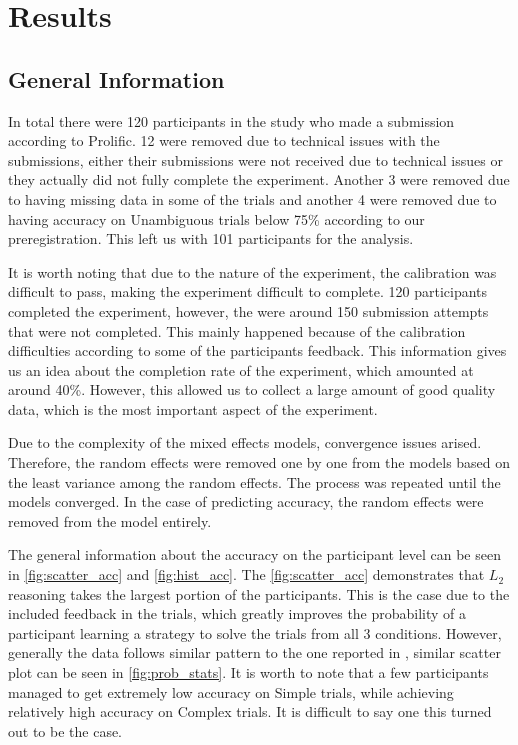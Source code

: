 ﻿\chapter{Results}
\label{chap:results}

\section{General Information}
\label{sec:general_info}
In total there were 120 participants in the study who made a submission according to Prolific. 12 were removed due to technical issues with the submissions, either their submissions were not received due to technical issues or they actually did not fully complete the experiment. Another 3 were removed due to having missing data in some of the trials and another 4 were removed due to having accuracy on Unambiguous trials below 75\% according to our preregistration. This left us with 101 participants for the analysis. 

It is worth noting that due to the nature of the experiment, the calibration was difficult to pass, making the experiment difficult to complete. 120 participants completed the experiment, however, the were around 150 submission attempts that were not completed. This mainly happened because of the calibration difficulties according to some of the participants feedback. This information gives us an idea about the completion rate of the experiment, which amounted at around 40\%. However, this allowed us to collect a large amount of good quality data, which is the most important aspect of the experiment.

Due to the complexity of the mixed effects models, convergence issues arised. Therefore, the random effects were removed one by one from the models based on the least variance among the random effects. The process was repeated until the models converged. In the case of predicting accuracy, the random effects were removed from the model entirely. 

The general information about the accuracy on the participant level can be seen in \autoref{fig:scatter_acc} and \autoref{fig:hist_acc}. The \autoref{fig:scatter_acc} demonstrates that $L_2$ reasoning takes the largest portion of the participants. This is the case due to the included feedback in the trials, which greatly improves the probability of a participant learning a strategy to solve the trials from all 3 conditions. However, generally the data follows similar pattern to the one reported in \cite{Franke_2016}, similar scatter plot can be seen in \autoref{fig:prob_stats}. It is worth to note that a few participants managed to get extremely low accuracy on Simple trials, while achieving relatively high accuracy on Complex trials. It is difficult to say one this turned out to be the case.


